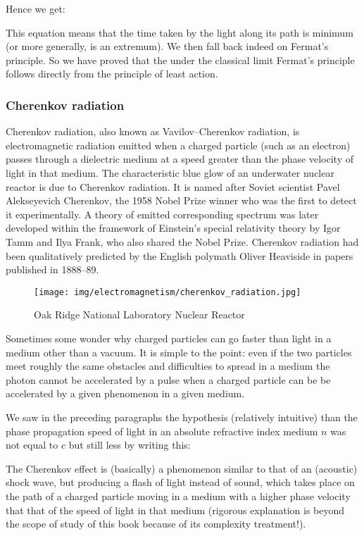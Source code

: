 	Hence we get:
	
	This equation means that the time taken by the light along its path is minimum (or more generally, is an extremum). We then fall back indeed on Fermat's principle. So we have proved that the under the classical limit  Fermat's principle follows directly from the principle of least action.
	
	\pagebreak
	\subsubsection{Cherenkov radiation}
	Cherenkov radiation, also known as Vavilov–Cherenkov radiation, is electromagnetic radiation emitted when a charged particle (such as an electron) passes through a dielectric medium at a speed greater than the phase velocity of light in that medium. The characteristic blue glow of an underwater nuclear reactor is due to Cherenkov radiation. It is named after Soviet scientist Pavel Alekseyevich Cherenkov, the 1958 Nobel Prize winner who was the first to detect it experimentally. A theory of emitted corresponding spectrum was later developed within the framework of Einstein's special relativity theory by Igor Tamm and Ilya Frank, who also shared the Nobel Prize. Cherenkov radiation had been qualitatively predicted by the English polymath Oliver Heaviside in papers published in 1888–89.
	
	\begin{figure}[H]
		\centering
		\texttt{[image: img/electromagnetism/cherenkov\_radiation.jpg]}
		\caption{Oak Ridge National Laboratory Nuclear Reactor}
	\end{figure}
	\begin{tcolorbox}[title=Remark,colframe=black,arc=10pt]
	Sometimes some wonder why charged particles can go faster than light in a medium other than a vacuum. It is simple to the point: even if the two particles meet roughly the same obstacles and difficulties to spread in a medium the photon cannot be accelerated by a pulse when a charged particle can be be accelerated by a given phenomenon in a given medium.
	\end{tcolorbox}
	We saw in the preceding paragraphs the hypothesis (relatively intuitive) than the phase propagation speed of light in an absolute refractive index medium $n$ was not equal to $c$ but still less by writing this:
	
	The Cherenkov effect is (basically) a phenomenon similar to that of an (acoustic) shock wave, but producing a flash of light instead of sound, which takes place on the path of a charged particle moving in a medium with a higher phase velocity that that of the speed of light in that medium (rigorous explanation is beyond the scope of study of this book because of its complexity treatment!).

